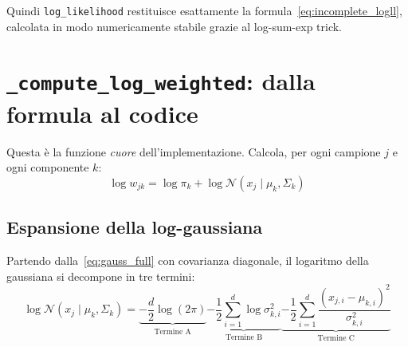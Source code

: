 \documentclass[11pt,a4paper]{article}
\begin{document}
Quindi \texttt{log\_likelihood} restituisce esattamente la
formula~\eqref{eq:incomplete_logll}, calcolata in modo numericamente
stabile grazie al log-sum-exp trick.

\section{\texttt{\_compute\_log\_weighted}: dalla formula al codice}
\label{sec:logweighted}

Questa è la funzione \emph{cuore} dell'implementazione. Calcola, per
ogni campione $j$ e ogni componente $k$:
\begin{equation}\label{eq:log_weighted}
  \log w_{jk} = \log \pi_k + \log \mathcal{N}(x_j \mid \mu_k, \Sigma_k)
\end{equation}

\subsection{Espansione della log-gaussiana}

Partendo dalla~\eqref{eq:gauss_full} con covarianza diagonale, il
logaritmo della gaussiana si decompone in tre termini:
\begin{equation}\label{eq:log_gauss_expanded}
  \log \mathcal{N}(x_j \mid \mu_k, \Sigma_k) =
  \underbrace{-\frac{d}{2}\log(2\pi)}_{\text{Termine A}}
  \underbrace{-\frac{1}{2}\sum_{i=1}^{d}\log\sigma_{k,i}^2}_{\text{Termine B}}
  \underbrace{-\frac{1}{2}\sum_{i=1}^{d}
  \frac{(x_{j,i}-\mu_{k,i})^2}{\sigma_{k,i}^2}}_{\text{Termine C}}
\end{equation}
\end{document}
